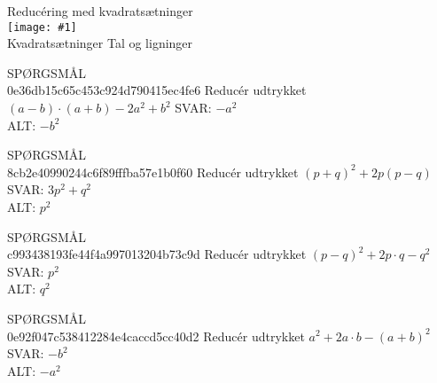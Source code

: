 \documentclass[]{article}
\newcounter{spgcounter}
\newenvironment{question}[2]{\addtocounter{spgcounter}{1} SPØRGSMÅL \thespgcounter\\}{\hspace{50px}}
\newcommand{\name}[1]{{\huge #1}\\}
\newcommand{\tag}[1]{#1}
\newcommand{\cover}[1]{\texttt{[image: \#1]}\\}
\newcommand{\answer}[1]{{\color{green} SVAR: #1}\\}
\newcommand{\alt}[1]{{\color{red} ALT: #1}\\}
\begin{document}
\name{Reducéring med kvadratsætninger}
\cover{kvadratsætninger.png}
\tag{Kvadratsætninger}
\tag{Tal og ligninger}

\begin{question}{multi}\id{0e36db15c65c453c924d790415ec4fe6}
Reducér udtrykket $(a-b)\cdot (a+b) - 2 a^2 + b^2$
\answer{$-a^2$}
\alt{$-b^2$}
\end{question}

\begin{question}{multi}\id{8cb2e40990244c6f89fffba57e1b0f60}
Reducér udtrykket $(p+q)^2 + 2 p (p - q)$
\answer{$3 p^2 + q^2$}
\alt{$p^2$}
\end{question}

\begin{question}{multi}\id{c993438193fe44f4a997013204b73c9d}
Reducér udtrykket $(p-q)^2+2p\cdot q - q^2$
\answer{$p^2$}
\alt{$q^2$}
\end{question}

\begin{question}{multi}\id{0e92f047c538412284e4caccd5cc40d2}
Reducér udtrykket $a^2 + 2a \cdot b - (a+b)^2$
\answer{$-b^2$}
\alt{$-a^2$}
\end{question}
\end{document}
